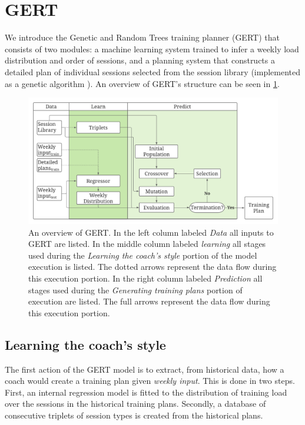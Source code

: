 \section{GERT}
\label{sec:GERT}
We introduce the Genetic and Random Trees training planner (GERT) that consists of two modules: a machine learning system trained to infer a weekly load distribution and order of sessions, and a planning system that constructs a detailed plan of individual sessions selected from the session library (implemented as a genetic algorithm \cite{whitley1994genetic}).
An overview of GERT's structure can be seen in \cref{fig:GERT_overview}.

\begin{figure}[ht]
    \centering
    \includegraphics[width=1.0\linewidth]{chapters/figures/implementation_plots/GERT_overview.pdf}
    \caption{An overview of GERT. In the left column labeled \textit{Data} all inputs to GERT are listed. In the middle column labeled \textit{learning} all stages used during the \textit{Learning the coach's style} portion of the model execution is listed. The dotted arrows represent the data flow during this execution portion.
    In the right column labeled \textit{Prediction} all stages used during the \textit{Generating training plans} portion of execution are listed. The full arrows represent the data flow during this execution portion.}
    \label{fig:GERT_overview}
\end{figure}

\subsection{Learning the coach's style}
The first action of the GERT model is to extract, from historical data, how a coach would create a training plan given \textit{weekly input}.
This is done in two steps. 
First, an internal regression model is fitted to the distribution of training load over the sessions in the historical training plans.
Secondly, a database of consecutive triplets of session types is created from the historical plans.

